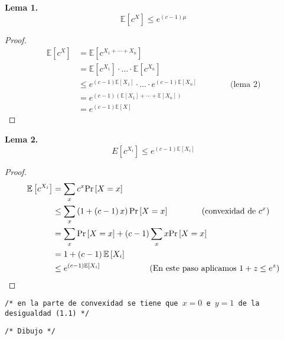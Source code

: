 \documentclass[english, spanish, fleqn, 10pt]{article}
\newcommand{\comentarioc}[1]{\texttt{\textcolor{webred}{/* #1 */}}}
\numberwithin{equation}{section}
\newcommand{\nparentesis}[1]{\left( #1 \right)}
\newcommand{\ncorchetes}[1]{\left[ #1 \right]}
\theoremstyle{definition}
\newcommand{\esperanza}[1]{\mathbb{E}\ncorchetes{#1}}
\begin{document}
\noindent \textbf{Lema 1.} 
\begin{equation*}
\esperanza{c^{X}} \leq e^{\nparentesis{c-1}\mu}
\end{equation*}
\begin{proof}
	\begin{align*}
	\esperanza{c^X} &= \esperanza{c^{X_1+\cdots + X_n}}\\
	&= \esperanza{c^{X_1}}\cdot \ldots \cdot \esperanza{c^{X_n}} \\
	&\leq e^{\nparentesis{c-1}\esperanza{X_1}}\cdot \ldots \cdot e^{\nparentesis{c-1}\esperanza{X_n}} \qquad\qquad\text{(lema 2)}\\
	&=e^{\nparentesis{c-1}\nparentesis{\esperanza{X_1}+\cdots + \esperanza{X_n}}}\\
	&= e^{\nparentesis{c-1}\esperanza{X}}
	\end{align*}
\end{proof}

\noindent \textbf{Lema 2.}
\begin{equation}
E\ncorchetes{c^{X_i}} \leq e^{\nparentesis{c-1}\esperanza{X_i}}
\end{equation}

\begin{proof}
	\begin{align*}
	\esperanza{c^{X_i}} &= \sum_x c^x \pr{X=x}\\
	&\leq \sum_x \nparentesis{1 + \nparentesis{c-1}x}\pr{X = x}\qquad\qquad\text{(convexidad de $c^x$)}\\
	&= \sum_x \pr{X=x} + \nparentesis{c-1}\sum_x x \pr{X=x}\\
	&= 1 + \nparentesis{c-1}\esperanza{X_i}\\
	&\leq e^{\nparentesis{c-1}\esperanza{X_i}}\qquad\qquad\qquad\text{(En este paso aplicamos $1+z\leq e^z$)}
	\end{align*}
\end{proof}
\comentarioc{en la parte de convexidad se tiene que $x=0$ e $y=1$ de la desigualdad (1.1)}
\begin{center}
	\comentarioc{Dibujo}
\end{center}
\end{document}
